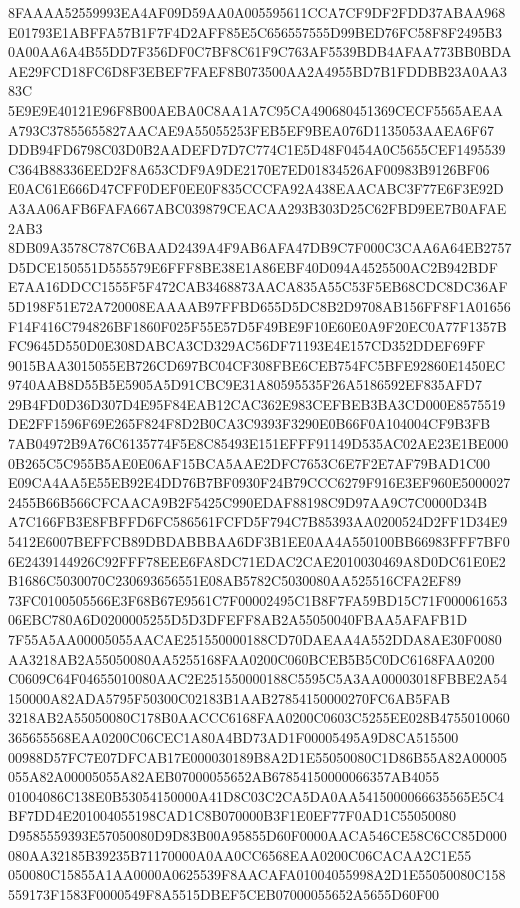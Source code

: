 \documentclass[UTF8,fontset=fandol,zihao=-4,a4paper]{ctexart}
\begin{document}
{{8FAAAA52559993EA4AF09D59AA0A005595611CCA7CF9DF2FDD37ABAA968E01793E1ABFFA57B1F7F4D2AFF85E5C656557555D99BED76FC58F8F2495B3
0A00AA6A4B55DD7F356DF0C7BF8C61F9C763AF5539BDB4AFAA773BB0BDAAE29FCD18FC6D8F3EBEF7FAEF8B073500AA2A4955BD7B1FDDBB23A0AA383C
5E9E9E40121E96F8B00AEBA0C8AA1A7C95CA490680451369CECF5565AEAAA793C37855655827AACAE9A55055253FEB5EF9BEA076D1135053AAEA6F67
DDB94FD6798C03D0B2AADEFD7D7C774C1E5D48F0454A0C5655CEF1495539C364B88336EED2F8A653CDF9A9DE2170E7ED01834526AF00983B9126BF06
E0AC61E666D47CFF0DEF0EE0F835CCCFA92A438EAACABC3F77E6F3E92DA3AA06AFB6FAFA667ABC039879CEACAA293B303D25C62FBD9EE7B0AFAE2AB3
8DB09A3578C787C6BAAD2439A4F9AB6AFA47DB9C7F000C3CAA6A64EB2757D5DCE150551D555579E6FFF8BE38E1A86EBF40D094A4525500AC2B942BDF
E7AA16DDCC1555F5F472CAB3468873AACA835A55C53F5EB68CDC8DC36AF5D198F51E72A720008EAAAAB97FFBD655D5DC8B2D9708AB156FF8F1A01656
F14F416C794826BF1860F025F55E57D5F49BE9F10E60E0A9F20EC0A77F1357BFC9645D550D0E308DABCA3CD329AC56DF71193E4E157CD352DDEF69FF
9015BAA3015055EB726CD697BC04CF308FBE6CEB754FC5BFE92860E1450EC9740AAB8D55B5E5905A5D91CBC9E31A80595535F26A5186592EF835AFD7
29B4FD0D36D307D4E95F84EAB12CAC362E983CEFBEB3BA3CD000E8575519DE2FF1596F69E265F824F8D2B0CA3C9393F3290E0B66F0A104004CF9B3FB
7AB04972B9A76C6135774F5E8C85493E151EFFF91149D535AC02AE23E1BE0000B265C5C955B5AE0E06AF15BCA5AAE2DFC7653C6E7F2E7AF79BAD1C00
E09CA4AA5E55EB92E4DD76B7BF0930F24B79CCC6279F916E3EF960E50000272455B66B566CFCAACA9B2F5425C990EDAF88198C9D97AA9C7C0000D34B
A7C166FB3E8FBFFD6FC586561FCFD5F794C7B85393AA0200524D2FF1D34E95412E6007BEFFCB89DBDABBBAA6DF3B1EE0AA4A550100BB66983FFF7BF0
6E2439144926C92FFF78EEE6FA8DC71EDAC2CAE2010030469A8D0DC61E0E2B1686C5030070C230693656551E08AB5782C5030080AA525516CFA2EF89
73FC0100505566E3F68B67E9561C7F00002495C1B8F7FA59BD15C71F00006165306EBC780A6D0200005255D5D3DFEFF8AB2A55050040FBAA5AFAFB1D
7F55A5AA00005055AACAE251550000188CD70DAEAA4A552DDA8AE30F0080AA3218AB2A55050080AA5255168FAA0200C060BCEB5B5C0DC6168FAA0200
C0609C64F04655010080AAC2E251550000188C5595C5A3AA00003018FBBE2A54150000A82ADA5795F50300C02183B1AAB27854150000270FC6AB5FAB
3218AB2A55050080C178B0AACCC6168FAA0200C0603C5255EE028B4755010060365655568EAA0200C06CEC1A80A4BD73AD1F00005495A9D8CA515500
00988D57FC7E07DFCAB17E000030189B8A2D1E55050080C1D86B55A82A00005055A82A00005055A82AEB07000055652AB67854150000066357AB4055
01004086C138E0B53054150000A41D8C03C2CA5DA0AA5415000066635565E5C4BF7DD4E201004055198CAD1C8B070000B3F1E0EF77F0AD1C55050080
D9585559393E57050080D9D83B00A95855D60F0000AACA546CE58C6CC85D000080AA32185B39235B71170000A0AA0CC6568EAA0200C06CACAA2C1E55
050080C15855A1AA0000A0625539F8AACAFA01004055998A2D1E55050080C158559173F1583F0000549F8A5515DBEF5CEB07000055652A5655D60F00
}}
\end{document}
